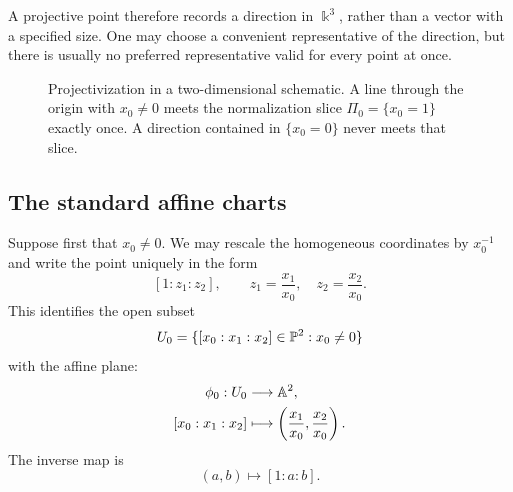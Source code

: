 A projective point therefore records a direction in \(\Bbbk^3\), rather
than a vector with a specified size. One may choose a convenient
representative of the direction, but there is usually no preferred
representative valid for every point at once.

\begin{figure}[ht]
\centering
{}
\caption{Projectivization in a two-dimensional schematic. A line
through the origin with \(x_0\neq0\) meets the normalization slice
\(\Pi_0=\{x_0=1\}\) exactly once. A direction contained in
\(\{x_0=0\}\) never meets that slice.}
\label{fig:p2-lines-through-origin}
\end{figure}

\subsection{The standard affine charts}

Suppose first that \(x_0\neq0\). We may rescale the homogeneous
coordinates by \(x_0^{-1}\) and write the point uniquely in the form
\[
[1:z_1:z_2],
\qquad
z_1=\frac{x_1}{x_0},
\quad
z_2=\frac{x_2}{x_0}.
\]
This identifies the open subset
\[
U_0=\{[x_0:x_1:x_2]\in\mathbb{P}^2:x_0\neq0\}
\]
with the affine plane:
\[
\begin{aligned}
\phi_0:U_0&\longrightarrow\mathbb{A}^2,\\
[x_0:x_1:x_2]
&\longmapsto
\left(\frac{x_1}{x_0},\frac{x_2}{x_0}\right).
\end{aligned}
\]
The inverse map is
\[
(a,b)\longmapsto[1:a:b].
\]

